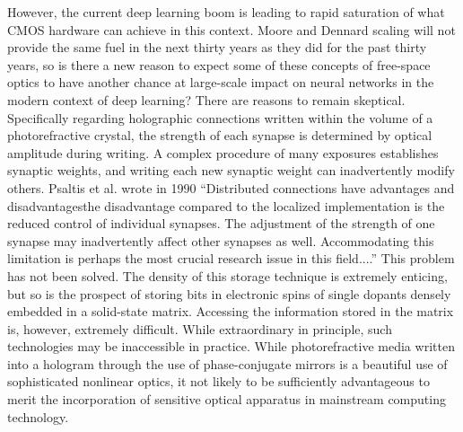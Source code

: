 However, the current deep learning boom is leading to rapid saturation of what CMOS hardware can achieve in this context. Moore and Dennard scaling will not provide the same fuel in the next thirty years as they did for the past thirty years, so is there a new reason to expect some of these concepts of free-space optics to have another chance at large-scale impact on neural networks in the modern context of deep learning? There are reasons to remain skeptical. Specifically regarding holographic connections written within the volume of a photorefractive crystal, the strength of each synapse is determined by optical amplitude during writing. A complex procedure of many exposures establishes synaptic weights, and writing each new synaptic weight can inadvertently modify others. Psaltis et al. wrote in 1990 ``Distributed connections have advantages and disadvantages\textemdash the disadvantage compared to the localized implementation is the reduced control of individual synapses. The adjustment of the strength of one synapse may inadvertently affect other synapses as well. Accommodating this limitation is perhaps the most crucial research issue in this field....'' This problem has not been solved. The density of this storage technique is extremely enticing, but so is the prospect of storing bits in electronic spins of single dopants densely embedded in a solid-state matrix. Accessing the information stored in the matrix is, however, extremely difficult. While extraordinary in principle, such technologies may be inaccessible in practice. While photorefractive media written into a hologram through the use of phase-conjugate mirrors is a beautiful use of sophisticated nonlinear optics, it not likely to be sufficiently advantageous to merit the incorporation of sensitive optical apparatus in mainstream computing technology.

